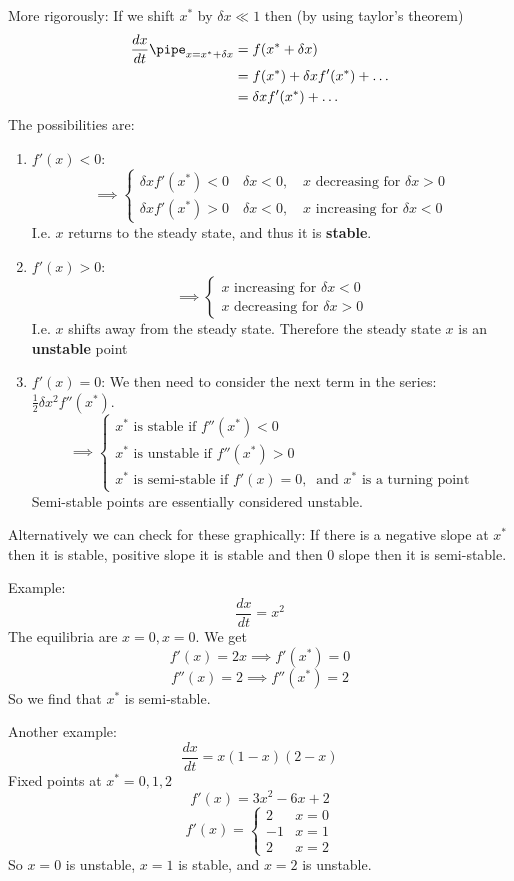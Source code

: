 \documentclass{/home/janmebows/Documents/LatexTemplates/myassignment}
\begin{document}
More rigorously:
If we shift $x^*$ by $\delta x \ll 1$ then (by using taylor's theorem)
\begin{align*}
\frac{dx}{dt}\pipe_{x=x^*+\delta x} &= f(x^* + \delta x)\\
&= f(x^*) + \delta x f'(x^*) + \hdots\\
&= \delta x f'(x^*) + \hdots
\end{align*}
The possibilities are:
\begin{enumerate}
    \item $f'(x) < 0 $: 
    \[\implies \begin{cases}\delta x f'(x^*) < 0 \quad \delta x < 0, \quad x\text{ decreasing for } \delta x > 0\\
    \delta x f'(x^*) > 0\quad \delta x < 0, \quad x \text{ increasing for } \delta x <0\end{cases}\]
    I.e. $x$ returns to the steady state, and thus it is \textbf{stable}.
    \item $f'(x) > 0 $: 
    \[\implies \begin{cases}x \text{ increasing for } \delta x <0\\
    x \text{ decreasing for } \delta x > 0\end{cases}\]
    I.e. $x$ shifts away from the steady state. Therefore the steady state $x$ is an \textbf{unstable} point
    \item $f'(x) = 0 $: We then need to consider the next term in the series: $\frac12 \delta x^2 f''(x^*)$.
    \[\implies \begin{cases}x^* \text{ is stable if } f''(x^*) < 0\\
    x^* \text{ is unstable if } f''(x^*) > 0 \\
    x^* \text{ is semi-stable if } f'(x) = 0, \ \text{ and }x^* \text{ is a turning point}
    \end{cases}\]
    Semi-stable points are essentially considered unstable.
\end{enumerate}
Alternatively we can check for these graphically:
If there is a negative slope at $x^*$ then it is stable, positive slope it is stable and then $0$ slope then it is semi-stable.

Example:
\[\frac{dx}{dt} = x^2\]
The equilibria are $x=0, x=0$.
We get
\[f'(x) = 2x \implies f'(x^*)= 0\]
\[f''(x) = 2 \implies f''(x^*) = 2\]
So we find that $x^*$ is semi-stable.

Another example:
\[\frac{dx}{dt} = x(1-x)(2-x)\]
Fixed points at $x^*=0,1,2$
\[f'(x) = 3x^2 - 6x + 2\]
\[f'(x) = \begin{cases}2 & x=0\\ -1 & x=1\\2&x=2\end{cases}\]
So $x=0$ is unstable, $x=1$ is stable, and $x=2$ is unstable.
\end{document}
